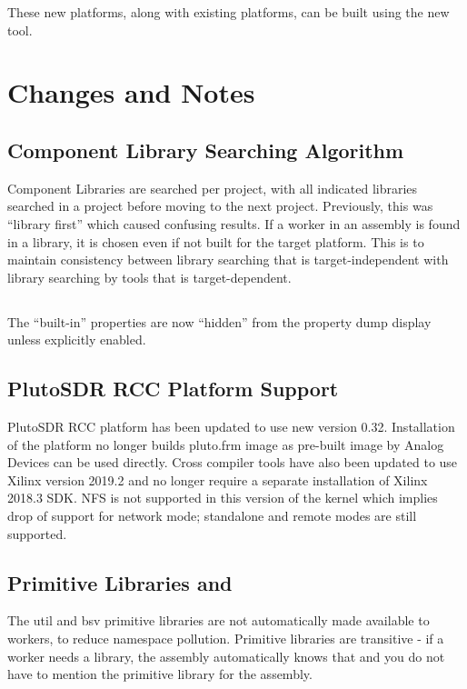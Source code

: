 These new platforms, along with existing platforms, can be built using the new  tool.


\section{Changes and Notes}

\subsection{Component Library Searching Algorithm}
\label{sec:20_component_library_searching}
Component Libraries are searched per project, with all indicated libraries searched in a project before moving to the next project. Previously, this was ``library first'' which caused confusing results. If a worker in an assembly is found in a library, it is chosen even if not built for the target platform. This is to maintain consistency between library searching that is target-independent with library searching by tools that is target-dependent.

\subsection{}
\label{sec:20_ocpigen}
The ``built-in'' properties are now ``hidden'' from the property dump display unless explicitly enabled.

\subsection{PlutoSDR RCC Platform Support}
\label{sec:20_plutosdr}
PlutoSDR RCC platform has been updated to use new version 0.32. Installation of the platform no longer builds pluto.frm image as pre-built image by Analog Devices can be used directly. Cross compiler tools have also been updated to use Xilinx version 2019.2 and no longer require a separate installation of Xilinx 2018.3 SDK. NFS is not supported in this version of the kernel which implies drop of support for network mode; standalone and remote modes are still supported.

\subsection{Primitive Libraries  and }
\label{sec:20_util_bsv_library}
The util and bsv primitive libraries are not automatically made available to workers, to reduce namespace pollution. Primitive libraries are transitive - if a worker needs a library, the assembly automatically knows that and you do not have to mention the primitive library for the assembly.\\

